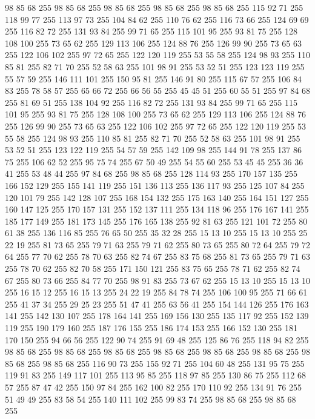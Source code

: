 98 85 68 255 98 85 68 255 98 85 68 255 98 85 68 255 98 85 68 255 115 92 71 255 118 99 77 255 113 97 73 255 104 84 62 255 110 76 62 255 116 73 66 255 124 69 69 255 116 82 72 255 131 93 84 255 99 71 65 255 115 101 95 255 93 81 75 255 128 108 100 255 73 65 62 255 129 113 106 255 124 88 76 255 126 99 90 255 73 65 63 255 122 106 102 255 97 72 65 255 122 120 119 255 53 55 58 255 124 98 93 255 110 85 81 255 82 71 70 255 52 58 63 255 101 98 91 255 53 52 51 255 123 123 119 255 55 57 59 255 146 111 101 255 150 95 81 255 146 91 80 255 115 67 57 255 106 84 83 255 78 58 57 255 65 66 72 255 66 56 55 255 45 45 51 255 60 55 51 255 97 84 68 255 81 69 51 255 138 104 92 255 116 82 72 255 131 93 84 255 99 71 65 255 115 101 95 255 93 81 75 255 128 108 100 255 73 65 62 255 129 113 106 255 124 88 76 255 126 99 90 255 73 65 63 255 122 106 102 255 97 72 65 255 122 120 119 255 53 55 58 255 124 98 93 255
110 85 81 255 82 71 70 255 52 58 63 255 101 98 91 255 53 52 51 255 123 122 119 255 54 57 59 255 142 109 98 255 144 91 78 255 137 86 75 255 106 62 52 255 95 75 74 255 67 50 49 255 54 55 60 255 53 45 45 255 36 36 41 255 53 48 44 255 97 84 68 255 98 85 68 255 128 114 93 255 170 157 135 255 166 152 129 255 155 141 119 255 151 136 113 255 136 117 93 255 125 107 84 255 120 101 79 255 142 128 107 255 168 154 132 255 175 163 140 255 164 151 127 255 160 147 125 255 170 157 131 255 152 137 111 255 134 118 96 255 176 167 141 255 185 177 149 255 181 173 145 255 176 165 138 255 92 81 63 255 121 101 72 255 80 61 38 255 136 116 85 255 76 65 50 255 35 32 28 255 15 13 10 255 15 13 10 255 25 22 19 255 81 73 65 255 79 71 63 255 79 71 62 255 80 73 65 255 80 72 64 255 79 72 64 255 77 70 62 255 78 70 63 255 82 74 67 255 83 75 68 255 81 73 65 255 79 71 63 255 78 70 62 255 82 70 58 255 171 150 121 255 83 75 65 255
78 71 62 255 82 74 67 255 80 73 66 255 84 77 70 255 98 91 83 255 73 67 62 255 15 13 10 255 15 13 10 255 16 15 12 255 16 15 13 255 24 22 19 255 84 78 74 255 106 100 95 255 71 66 61 255 41 37 34 255 29 25 23 255 51 47 41 255 63 56 41 255 154 144 126 255 176 163 141 255 142 130 107 255 178 164 141 255 169 156 130 255 135 117 92 255 152 139 119 255 190 179 160 255 187 176 155 255 186 174 153 255 166 152 130 255 181 170 150 255 94 66 56 255 122 90 74 255 91 69 48 255 125 86 76 255 118 94 82 255 98 85 68 255 98 85 68 255 98 85 68 255 98 85 68 255 98 85 68 255 98 85 68 255 98 85 68 255 98 85 68 255 116 90 73 255 155 92 71 255 104 60 48 255 131 95 75 255 119 91 83 255 149 117 101 255 113 95 85 255 118 97 85 255 130 86 75 255 112 68 57 255 87 47 42 255 150 97 84 255 162 100 82 255 170 110 92 255 134 91 76 255 51 49 49 255 83 58 54 255 140 111 102 255 99 83 74 255 98 85 68 255 98 85 68 255
